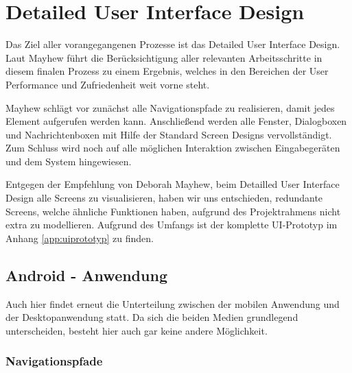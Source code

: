 \chapter{Detailed User Interface Design}
Das Ziel aller vorangegangenen Prozesse ist das Detailed User Interface Design. Laut Mayhew führt die Berücksichtigung aller relevanten Arbeitsschritte in diesem finalen Prozess zu einem Ergebnis, welches in den Bereichen der User Performance und Zufriedenheit weit vorne steht. \cite[325]{Mayhew_UEL}

Mayhew schlägt vor zunächst alle Navigationspfade zu realisieren, damit jedes Element aufgerufen werden kann. Anschließend werden alle Fenster, Dialogboxen und Nachrichtenboxen mit Hilfe der Standard Screen Designs vervollständigt. Zum Schluss wird noch auf alle möglichen Interaktion zwischen Eingabegeräten und dem System hingewiesen. 

Entgegen der Empfehlung von Deborah Mayhew, beim Detailled User Interface Design alle Screens zu visualisieren, haben wir uns entschieden, redundante Screens, welche ähnliche Funktionen haben, aufgrund des Projektrahmens nicht extra zu modellieren.
Aufgrund des Umfangs ist der komplette UI-Prototyp im Anhang \ref{app:uiprototyp} zu finden.

\section{Android - Anwendung}
Auch hier findet erneut die Unterteilung zwischen der mobilen Anwendung und der Desktopanwendung statt. Da sich die beiden Medien grundlegend unterscheiden, besteht hier auch gar keine andere Möglichkeit.
\subsection{Navigationspfade}

